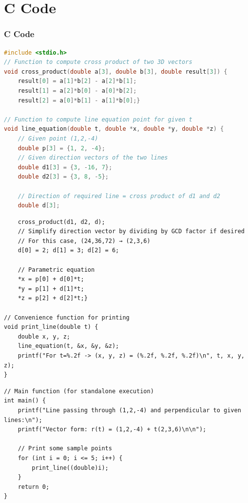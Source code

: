 \documentclass{beamer}
\theoremstyle{remark}
\numberwithin{equation}{section}
\begin{document}
\section{C Code}
\begin{frame}[fragile]
\frametitle{C Code }
\begin{lstlisting}[language=C]
 #include <stdio.h>
// Function to compute cross product of two 3D vectors
void cross_product(double a[3], double b[3], double result[3]) {
    result[0] = a[1]*b[2] - a[2]*b[1];
    result[1] = a[2]*b[0] - a[0]*b[2];
    result[2] = a[0]*b[1] - a[1]*b[0];}

// Function to compute line equation point for given t
void line_equation(double t, double *x, double *y, double *z) {
    // Given point (1,2,-4)
    double p[3] = {1, 2, -4};
    // Given direction vectors of the two lines
    double d1[3] = {3, -16, 7};
    double d2[3] = {3, 8, -5};

    // Direction of required line = cross product of d1 and d2
    double d[3];
\end{lstlisting}
\end{frame}
\begin{frame}[fragile]
\begin{lstlisting}
    cross_product(d1, d2, d);
    // Simplify direction vector by dividing by GCD factor if desired
    // For this case, (24,36,72) → (2,3,6)
    d[0] = 2; d[1] = 3; d[2] = 6;

    // Parametric equation
    *x = p[0] + d[0]*t;
    *y = p[1] + d[1]*t;
    *z = p[2] + d[2]*t;}

// Convenience function for printing
void print_line(double t) {
    double x, y, z;
    line_equation(t, &x, &y, &z);
    printf("For t=%.2f -> (x, y, z) = (%.2f, %.2f, %.2f)\n", t, x, y, z);
}
\end{lstlisting}
\end{frame}
\begin{frame}[fragile]
\begin{lstlisting}
// Main function (for standalone execution)
int main() {
    printf("Line passing through (1,2,-4) and perpendicular to given lines:\n");
    printf("Vector form: r(t) = (1,2,-4) + t(2,3,6)\n\n");

    // Print some sample points
    for (int i = 0; i <= 5; i++) {
        print_line((double)i);
    }
    return 0;
}

\end{lstlisting}
\end{frame}
\end{document}
